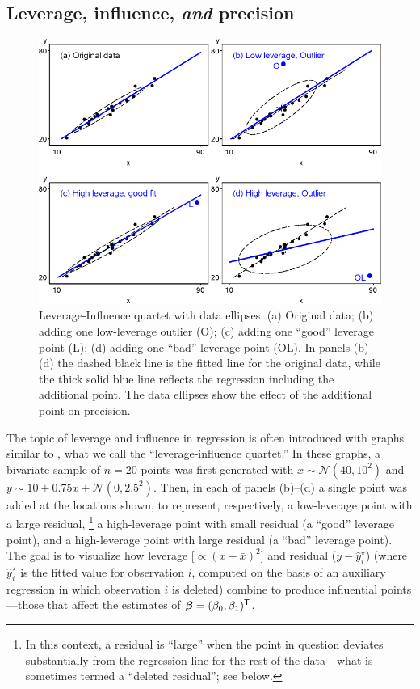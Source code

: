 \subsection{Leverage, influence, \emph{and} precision}

\begin{figure}[htb!]
  \centering
  \includegraphics[width=.9\textwidth,clip]{fig/levdemo21}
  \caption{Leverage-Influence quartet with data ellipses. (a) Original data;
  (b) adding one low-leverage outlier (O); (c) adding one ``good'' leverage point (L);
  (d) adding one ``bad'' leverage point (OL).
  In panels (b)--(d) the dashed black line is the fitted line for the original
  data, while the thick solid blue line reflects the  regression including the additional point.
  The data ellipses show the effect of the additional point on precision.}%
  \label{fig:levdemo21}
\end{figure}

The topic of leverage and influence in regression is often introduced with graphs
similar to , what we call
the ``leverage-influence quartet.''
In these graphs, a bivariate sample of $n=20$ points was first generated
with $x \sim \mathcal{N}(40, 10^2)$ and $y \sim 10 +  0.75 x + \mathcal{N}(0, 2.5^2)$.
Then, in each of
panels (b)--(d) a single point was added at the locations shown, to represent, respectively,
a low-leverage point with a large residual,%
\footnote{In this context, a residual is ``large'' when the point in question deviates substantially from the
regression line for the rest of the data---what is sometimes termed a ``deleted residual''; see below.} 
a high-leverage point with small residual
(a ``good'' leverage point), and a high-leverage point with large residual
(a ``bad'' leverage point).  The goal is to visualize how leverage [$\propto (x-\bar{x})^2$] and
residual ($y - \hat{y}^\star_i$) (where $\hat{y}^\star_{i}$ is the fitted value for observation $i$, computed on the basis of an auxiliary regression in which observation $i$ is deleted) combine to produce influential points---those that affect
the estimates of $\bm{\beta} = (\beta_0 , \beta_1)^\mathsf{T}$.



